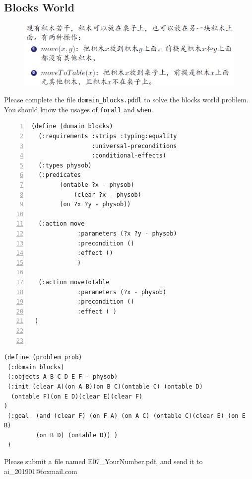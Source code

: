 ﻿\documentclass[a4paper, 11pt]{article}
\begin{document}
\subsection{Blocks World}
\label{sec:blocksworld}
\begin{figure}[h]
  \centering
  \includegraphics[width=17cm]{Pic/blocks}
\end{figure}

Please complete the file \texttt{domain\_blocks.pddl} to solve the blocks world problem. You should know the usages of \texttt{forall} and \texttt{when}.

\begin{lstlisting}[title=domain\_blocks.pddl,frame=single,language=lisp,numbers=left]
(define (domain blocks)
  (:requirements :strips :typing:equality
                 :universal-preconditions
                 :conditional-effects)
  (:types physob)
  (:predicates   
  	    (ontable ?x - physob)
            (clear ?x - physob)	
	    (on ?x ?y - physob))
		
  (:action move
             :parameters (?x ?y - physob)
             :precondition ()
             :effect ()
             )

  (:action moveToTable
             :parameters (?x - physob)
             :precondition ()
             :effect ( )
 )



\end{lstlisting}

\label{sec:problem-description}

\begin{lstlisting}[title=blocks.pddl]
(define (problem prob)
 (:domain blocks)
 (:objects A B C D E F - physob)
 (:init (clear A)(on A B)(on B C)(ontable C) (ontable D)
  (ontable F)(on E D)(clear E)(clear F)
)
 (:goal  (and (clear F) (on F A) (on A C) (ontable C)(clear E) (on E B) 
         (on B D) (ontable D)) )
 )
\end{lstlisting}

Please submit a file named \textsf{E07\_YourNumber.pdf}, and send it to \textsf{ai\_201901@foxmail.com}
\end{document}
